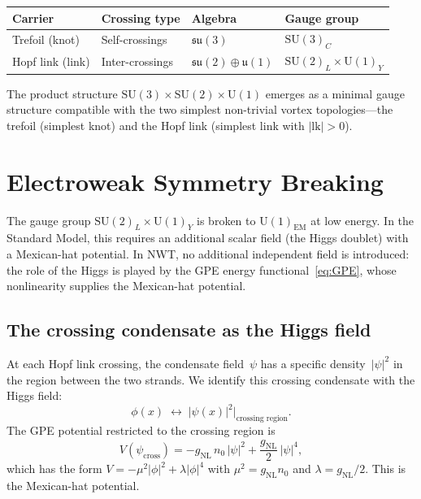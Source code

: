 \documentclass[11pt,a4paper]{article}
\begin{document}
\begin{center}
\begin{tabular}{llll}
\toprule
Carrier & Crossing type & Algebra & Gauge group \\
\midrule
Trefoil (knot) & Self-crossings &
  $\mathfrak{su}(3)$ & $\mathrm{SU}(3)_C$ \\
Hopf link (link) & Inter-crossings &
  $\mathfrak{su}(2) \oplus \mathfrak{u}(1)$ &
  $\mathrm{SU}(2)_L \times \mathrm{U}(1)_Y$ \\
\bottomrule
\end{tabular}
\end{center}

The product structure $\mathrm{SU}(3) \times \mathrm{SU}(2)
\times \mathrm{U}(1)$ emerges as a minimal gauge structure
compatible with the two simplest non-trivial vortex
topologies---the trefoil (simplest knot) and the Hopf link
(simplest link with $|\mathrm{lk}| > 0$).


\section{Electroweak Symmetry Breaking}
\label{sec:higgs}

The gauge group $\mathrm{SU}(2)_L \times \mathrm{U}(1)_Y$ is
broken to $\mathrm{U}(1)_{\text{EM}}$ at low energy.  In the
Standard Model, this requires an additional scalar field (the Higgs
doublet) with a Mexican-hat potential.  In NWT, no additional independent field is introduced: the role
of the Higgs is played by the GPE energy
functional~\eqref{eq:GPE}, whose nonlinearity supplies the
Mexican-hat potential.

\subsection{The crossing condensate as the Higgs field}

At each Hopf link crossing, the condensate field~$\psi$ has a
specific density~$|\psi|^2$ in the region between the two strands.
We identify this crossing condensate with the Higgs field:
\begin{equation}
  \phi(x) \;\longleftrightarrow\; |\psi(x)|^2
  \Big|_{\text{crossing region}}.
  \label{eq:higgs_id}
\end{equation}
The GPE potential restricted to the crossing region is
\begin{equation}
  V(\psi_{\text{cross}}) = -g_{\text{NL}}\,n_0\,|\psi|^2
    + \frac{g_{\text{NL}}}{2}\,|\psi|^4,
  \label{eq:mexican}
\end{equation}
which has the form $V = -\mu^2|\phi|^2 + \lambda|\phi|^4$ with
$\mu^2 = g_{\text{NL}} n_0$ and $\lambda = g_{\text{NL}}/2$.
This is the Mexican-hat potential.
\end{document}
